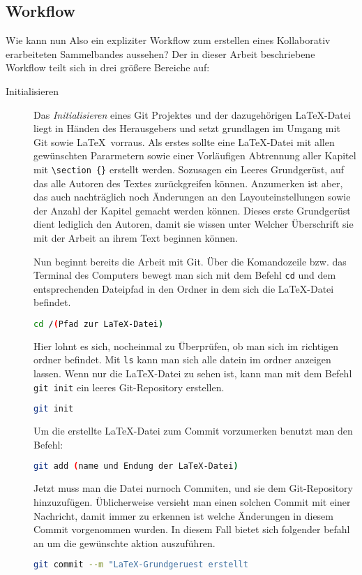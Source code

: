 \documentclass[12pt,a4paper]{scrartcl}
\begin{document}
\subsection{Workflow}
Wie kann nun Also ein expliziter Workflow zum erstellen eines Kollaborativ erarbeiteten Sammelbandes aussehen? Der in dieser Arbeit beschriebene Workflow teilt sich in drei größere Bereiche auf:

\begin{description}
\item[Initialisieren] Das \emph{Initialisieren} eines Git Projektes und der dazugehörigen \LaTeX -Datei liegt in Händen des Herausgebers und setzt grundlagen im Umgang mit Git sowie \LaTeX \ vorraus. Als erstes sollte eine \LaTeX -Datei mit allen gewünschten Pararmetern sowie einer Vorläufigen Abtrennung aller Kapitel mit \verb+\section+~\verb+{}+ erstellt werden. Sozusagen ein Leeres Grundgerüst, auf das alle Autoren des Textes zurückgreifen können. Anzumerken ist aber, das auch nachträglich noch Änderungen an den Layouteinstellungen sowie der Anzahl der Kapitel gemacht werden können. Dieses erste Grundgerüst dient lediglich den Autoren, damit sie wissen unter Welcher Überschrift sie mit der Arbeit an ihrem Text beginnen können.

Nun beginnt bereits die Arbeit mit Git. Über die Komandozeile bzw. das Terminal des Computers bewegt man sich mit dem Befehl \verb+cd+ und dem entsprechenden Dateipfad in den Ordner in dem sich die \LaTeX -Datei befindet.
\begin{lstlisting}[language=bash]
cd /(Pfad zur LaTeX-Datei)
\end{lstlisting}
 Hier lohnt es sich, nocheinmal zu Überprüfen, ob man sich im richtigen ordner befindet. Mit \verb+ls+ kann man sich alle datein im ordner anzeigen lassen. Wenn nur die \LaTeX-Datei zu sehen ist, kann man mit dem Befehl \verb+git init+ ein leeres Git-Repository erstellen.
\begin{lstlisting}[language=bash]
git init
\end{lstlisting}
 Um die erstellte \LaTeX -Datei zum Commit vorzumerken benutzt man den Befehl:
\begin{lstlisting}[language=bash]
git add (name und Endung der LaTeX-Datei)
\end{lstlisting} Jetzt muss man die Datei nurnoch Commiten, und sie dem Git-Repository hinzuzufügen. Üblicherweise versieht man einen solchen Commit mit einer Nachricht, damit immer zu erkennen ist welche Änderungen in diesem Commit vorgenommen wurden. In diesem Fall bietet sich folgender befahl an um die gewünschte aktion auszuführen.
\begin{lstlisting}[language=bash]
git commit --m "LaTeX-Grundgeruest erstellt
\end{lstlisting}


\end{description}
\end{document}
